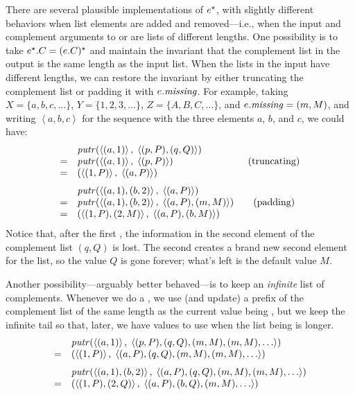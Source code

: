 There are several plausible implementations of
$e^\star$, with slightly different behaviors when list elements are
added and removed---i.e., when the input and complement arguments to \PUTR{}
or \PUTL{} are lists
of different lengths.  One possibility is to take $e^\star.C = (e.C)^\star$
and maintain the invariant that the complement list in the output is the same length as
the input list. When the lists in the input have different lengths, we can
restore the 
invariant by either truncating the complement list or padding it with
$e.\mathit{missing}$.
For example, taking $X = \{a,b,c,\ldots\}$, $Y = \{1,2,3,\ldots\}$, $Z =
\{A,B,C,\ldots\}$, and $e.\mathit{missing} = (m,M)$, and writing
$\left<a,b,c\right>$ for the sequence with the three elements $a$, $b$, and
$c$, we could have:
\[
\begin{array}{ll}
& \mathit{putr} (\left<(a,1)\right>,\;
         \left<(p,P),(q,Q)\right>)
\\
= &\mathit{putr} (\left<(a,1)\right>,\;
         \left<(p,P)\right>)\mbox{\hspace{7.7em}(truncating)}
\\
= & ( \left<(1,P)\right>,\; \left<(a,P)\right>)
\\ [1.5ex]
& \mathit{putr} (\left<(a,1),(b,2)\right>,\;
         \left<(a,P)\right>)
\\
= &\mathit{putr} (\left<(a,1),(b,2)\right>,\;
         \left<(a,P),(m,M)\right>)\mbox{\qquad(padding)}
\\
= & (\left<(1,P),(2,M)\right>,\;
         \left<(a,P),(b,M)\right>)
\end{array}
\]
Notice that, after the first \PUTR{}, the information in the second
element of the complement list $(q,Q)$ is lost.
The second \PUTR{} creates a brand new second element for the list, so the value $Q$ is
gone forever; what's left is the default value $M$.

Another possibility---arguably better behaved---is to keep
  an {\em 
  infinite} list of complements.  Whenever we do a \PUT{}, we use (and
update) a prefix of the complement list of the same length as the current
value being \PUT, but we keep the infinite tail so that, later, we have
  values to use when the list being \PUT{} is longer.
\[
\begin{array}{ll}
& \mathit{putr} (\left<(a,1)\right>,\;
         \left<(p,P),(q,Q),(m,M),(m,M),\ldots\right>) 
\\
= & ( \left<(1,P)\right>,\; \left<(a,P),(q,Q),(m,M),(m,M),\ldots\right>)
\\ [1.5ex]
& \mathit{putr} (\left<(a,1),(b,2)\right>,\;
         \left<(a,P),(q,Q),(m,M),(m,M),\ldots\right>)
\\
= & (\left<(1,P),(2,Q)\right>,\;
         \left<(a,P),(b,Q),(m,M),\ldots\right>)
\end{array}
\]

